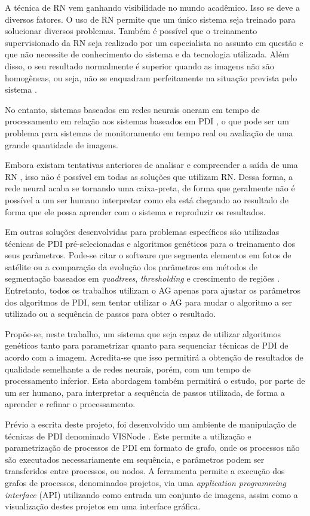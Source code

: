 \documentclass[12pt,oneside,a4paper,english,french,spanish,brazil,]{abntex2}
\begin{document}
A técnica de RN vem ganhando visibilidade no mundo acadêmico. Isso se deve a diversos fatores. O uso de RN permite que um único sistema seja treinado para solucionar diversos problemas. Também é possível que o treinamento supervisionado da RN seja realizado por um especialista no assunto em questão e que não necessite de conhecimento do sistema e da tecnologia utilizada. Além disso, o seu resultado normalmente é superior quando as imagens não são homogêneas, ou seja, não se enquadram perfeitamente na situação prevista pelo sistema \cite{pal:1993}.

No entanto, sistemas baseados em redes neurais oneram em tempo de processamento em relação aos sistemas baseados em PDI \cite{huang:1992}, o que pode ser um problema para sistemas de monitoramento em tempo real ou avaliação de uma grande quantidade de imagens.

Embora existam tentativas anteriores de analisar e compreender a saída de uma RN \cite{zeiler:2014}, isso não é possível em todas as soluções que utilizam RN. Dessa forma, a rede neural acaba se tornando uma caixa-preta, de forma que geralmente não é possível a um ser humano interpretar como ela está chegando ao resultado de forma que ele possa aprender com o sistema e reproduzir os resultados.

Em outras soluções desenvolvidas para problemas específicos são utilizadas técnicas de PDI pré-selecionadas e algoritmos genéticos \cite{holland:1992} para o treinamento dos seus parâmetros. Pode-se citar o software que segmenta elementos em fotos de satélite \cite{costa:2010} ou a comparação da evolução dos parâmetros em métodos de segmentação baseados em \textit{quadtrees}, \textit{thresholding} e crescimento de regiões \cite{matias:2007}. Entretanto, todos os trabalhos utilizam o AG apenas para ajustar os parâmetros dos algoritmos de PDI, sem tentar utilizar o AG para mudar o algoritmo a ser utilizado ou a sequência de passos para obter o resultado.

Propõe-se, neste trabalho, um sistema que seja capaz de utilizar algoritmos genéticos tanto para parametrizar quanto para sequenciar técnicas de PDI de acordo com a imagem. Acredita-se que isso permitirá a obtenção de resultados de qualidade semelhante a de redes neurais, porém, com um tempo de processamento inferior. Esta abordagem também permitirá o estudo, por parte de um ser humano, para interpretar a sequência de passos utilizada, de forma a aprender e refinar o processamento.

Prévio a escrita deste projeto, foi desenvolvido um ambiente de manipulação de técnicas de PDI denominado VISNode \cite{visnode:2018}. Este permite a utilização e parametrização de processos de PDI em formato de grafo, onde os processos não são executados necessariamente em sequência, e parâmetros podem ser transferidos entre processos, ou nodos. A ferramenta permite a execução dos grafos de processos, denominados projetos, via uma \textit{application programming interface} (API) utilizando como entrada um conjunto de imagens, assim como a visualização destes projetos em uma interface gráfica.
\end{document}
